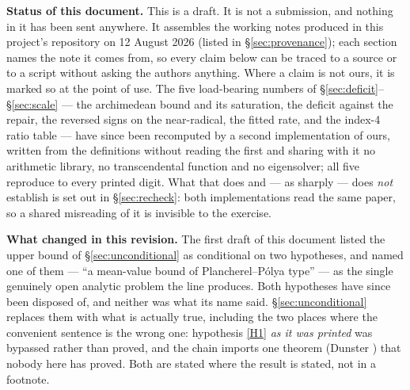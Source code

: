 \documentclass[11pt,a4paper]{article}
\theoremstyle{plain}
\theoremstyle{definition}
\theoremstyle{remark}
\begin{document}
\noindent
\textbf{Status of this document.}  This is a draft.  It is not a submission, and
nothing in it has been sent anywhere.  It assembles the working notes produced
in this project's repository on 12 August 2026 (listed in \S\ref{sec:provenance});
each section names the note it comes from, so every claim below can be traced to a source or to a script
without asking the authors anything.  Where a claim is not ours, it is marked so
at the point of use.  The five load-bearing numbers of
\S\ref{sec:deficit}--\S\ref{sec:scale} --- the archimedean bound and its
saturation, the deficit against the repair, the reversed signs on the
near-radical, the fitted rate, and the index-4 ratio table --- have since been
recomputed by a second implementation of ours, written from the definitions
without reading the first and sharing with it no arithmetic library, no
transcendental function and no eigensolver; all five reproduce to every printed
digit.  What that does and --- as sharply --- does
\emph{not} establish is set out in \S\ref{sec:recheck}: both implementations
read the same paper, so a shared misreading of it is invisible to the exercise.

\medskip\noindent
\textbf{What changed in this revision.}  The first draft of this document listed
the upper bound of \S\ref{sec:unconditional} as conditional on two hypotheses,
and named one of them --- ``a mean-value bound of Plancherel--P\'olya type'' ---
as the single genuinely open analytic problem the line produces.  Both
hypotheses have since been disposed of, and neither was what its name said.
\S\ref{sec:unconditional} replaces them with what is actually true, including
the two places where the convenient sentence is the wrong one: hypothesis
\eqref{H1} \emph{as it was printed} was bypassed rather than proved, and the
chain imports one theorem (Dunster \cite{Dunster2017}) that nobody here has
proved.  Both are stated where the result is stated, not in a footnote.
\end{document}

